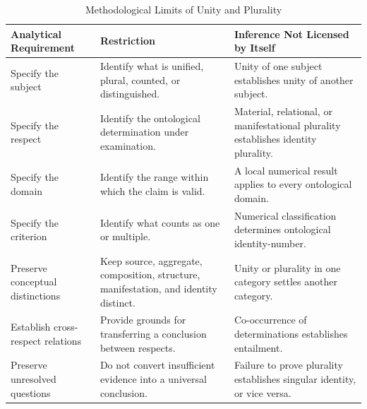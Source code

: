 %
%
%
%

\begin{table}[htbp]
\centering
\caption{Methodological Limits of Unity and Plurality}
\label{tab:methodological-limits-of-unity-and-plurality}
\footnotesize
\renewcommand{\arraystretch}{1.2}

\begin{tabularx}{\textwidth}{
    @{}
    p{}
    X
    p{}
    @{}
}
\toprule
\textbf{Analytical Requirement} &
\textbf{Restriction} &
\textbf{Inference Not Licensed by Itself}
\\
\midrule

Specify the subject &
Identify what is unified, plural, counted, or distinguished. &
Unity of one subject establishes unity of another subject.
\\

Specify the respect &
Identify the ontological determination under examination. &
Material, relational, or manifestational plurality establishes identity plurality.
\\

Specify the domain &
Identify the range within which the claim is valid. &
A local numerical result applies to every ontological domain.
\\

Specify the criterion &
Identify what counts as one or multiple. &
Numerical classification determines ontological identity-number.
\\

Preserve conceptual distinctions &
Keep source, aggregate, composition, structure, manifestation, and identity distinct. &
Unity or plurality in one category settles another category.
\\

Establish cross-respect relations &
Provide grounds for transferring a conclusion between respects. &
Co-occurrence of determinations establishes entailment.
\\

Preserve unresolved questions &
Do not convert insufficient evidence into a universal conclusion. &
Failure to prove plurality establishes singular identity, or vice versa.
\\

\bottomrule
\end{tabularx}
\end{table}

